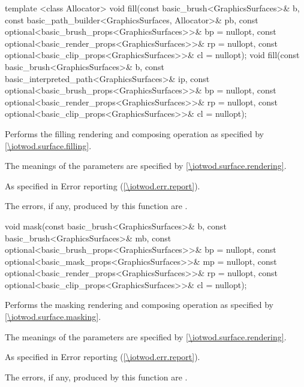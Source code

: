 %
\begin{itemdecl}
template <class Allocator>
void fill(const basic_brush<GraphicsSurfaces>& b,
  const basic_path_builder<GraphicsSurfaces, Allocator>& pb,
  const optional<basic_brush_props<GraphicsSurfaces>>& bp = nullopt,
  const optional<basic_render_props<GraphicsSurfaces>>& rp = nullopt,
  const optional<basic_clip_props<GraphicsSurfaces>>& cl = nullopt);
void fill(const basic_brush<GraphicsSurfaces>& b,
  const basic_interpreted_path<GraphicsSurfaces>& ip,
  const optional<basic_brush_props<GraphicsSurfaces>>& bp = nullopt,
  const optional<basic_render_props<GraphicsSurfaces>>& rp = nullopt,
  const optional<basic_clip_props<GraphicsSurfaces>>& cl = nullopt);
\end{itemdecl}
\begin{itemdescr}
\pnum
\effects
Performs the filling rendering and composing operation as specified by \ref{\iotwod.surface.filling}.

\pnum
The meanings of the parameters are specified by \ref{\iotwod.surface.rendering}.

\pnum
\throws
As specified in Error reporting (\ref{\iotwod.err.report}).

\pnum
\errors
The errors, if any, produced by this function are .
\end{itemdescr}

%
\begin{itemdecl}
void mask(const basic_brush<GraphicsSurfaces>& b,
  const basic_brush<GraphicsSurfaces>& mb,
  const optional<basic_brush_props<GraphicsSurfaces>>& bp = nullopt,
  const optional<basic_mask_props<GraphicsSurfaces>>& mp = nullopt,
  const optional<basic_render_props<GraphicsSurfaces>>& rp = nullopt,
  const optional<basic_clip_props<GraphicsSurfaces>>& cl = nullopt);
\end{itemdecl}
\begin{itemdescr}
\pnum
\effects
Performs the masking rendering and composing operation as specified by \ref{\iotwod.surface.masking}.

\pnum
The meanings of the parameters are specified by \ref{\iotwod.surface.rendering}.

\pnum
\throws
As specified in Error reporting (\ref{\iotwod.err.report}).

\pnum
\errors

The errors, if any, produced by this function are .
\end{itemdescr}

